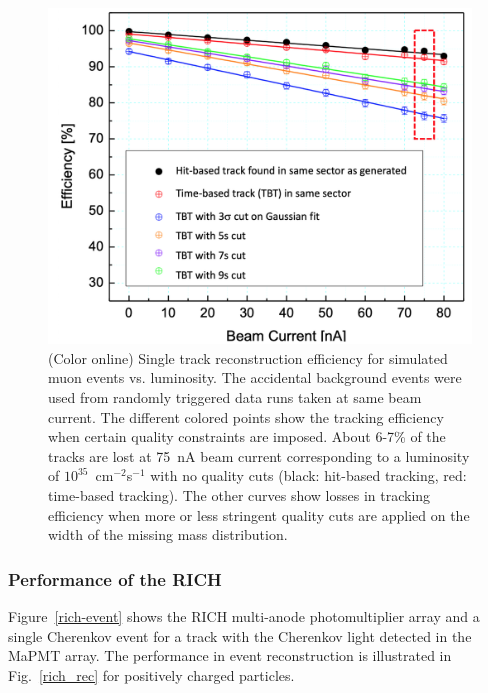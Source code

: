 \documentclass[final,3p,twocolumn]{elsarticle}
\begin{document}
\begin{figure}[t!]
\centerline{\includegraphics[width=1.0\columnwidth]{efficiencies.png}}
\caption{(Color online) Single track reconstruction efficiency for simulated muon events vs. luminosity. 
The accidental background events were used from randomly triggered data runs taken at same beam current. 
The different colored points show the
tracking efficiency when certain quality constraints are imposed. About 6-7\% of the tracks are lost at 75~nA
beam current corresponding to a luminosity of $10^{35}$~cm$^{-2}$s$^{-1}$ with no quality cuts (black: hit-based
tracking, red: time-based tracking). The other curves show losses in tracking efficiency when more or less 
stringent quality cuts are applied on the width of the missing mass distribution.}
\label{efficiencies}
\end{figure}

\subsubsection{Performance of the RICH} 

Figure~\ref{rich-event} shows the RICH multi-anode photomultiplier array and a single Cherenkov event for a
track with the Cherenkov light detected in the MaPMT array.  The performance in event reconstruction is
illustrated in Fig.~\ref{rich_rec} for positively charged particles. 
\end{document}
